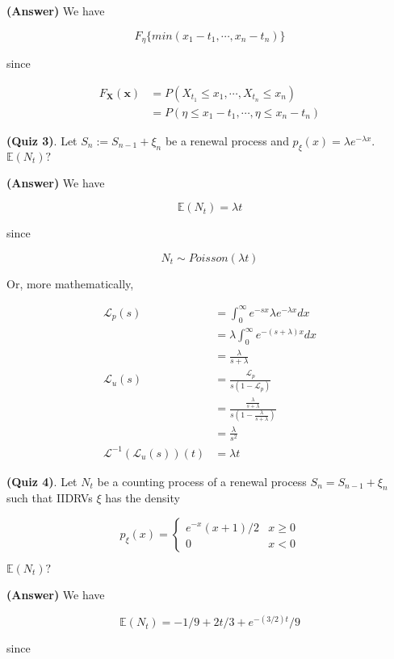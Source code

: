 \documentclass[12pt]{article}
\theoremstyle{nonumberbreak}
\begin{document}
\textbf{(Answer)} We have

$$
F_{\eta} \{ min \left( x_1 - t_1, \cdots, x_n - t_n \right) \}
$$

since

$$
\begin{aligned}
F_\mathbf{X} (\mathbf{x}) &= P(X_{t_1} \le x_1, \cdots, X_{t_n} \le x_n) \\[8pt]
&= P(\eta \le x_1 - t_1, \cdots, \eta \le x_n - t_n)
\end{aligned}
$$


\textbf{(Quiz 3)}. Let $S_n := S_{n-1} + \xi_n$ be a renewal process and $p_\xi (x) = \lambda e^{-\lambda x}$. $\mathbb{E}(N_t)?$

\textbf{(Answer)} We have

$$
\mathbb{E}(N_t) = \lambda t
$$

since

$$
N_t \sim Poisson(\lambda t)
$$

Or, more mathematically, 

$$
\begin{aligned}
\mathcal{L}_p (s) &= \int_0^\infty e^{-sx} \lambda e^{-\lambda x} dx \\[8pt]
&= \lambda \int_0^\infty e^{-(s+\lambda)x} dx \\[8pt]
&= \frac{\lambda}{s + \lambda} \\[10pt]
\mathcal{L}_u (s) &= \frac{\mathcal{L}_p}{s(1-\mathcal{L}_p)} \\[8pt]
&= \frac{\frac{\lambda}{s + \lambda}}{s(1-\frac{\lambda}{s + \lambda})} \\[8pt]
&= \frac{\lambda}{s^2} \\[10pt]
\mathcal{L}^{-1}(\mathcal{L}_u (s))(t) &= \lambda t
\end{aligned}
$$


\textbf{(Quiz 4)}. Let $N_t$ be a counting process of a renewal process $S_n = S_{n-1} + \xi_n$ such that IIDRVs $\xi$ has the density

$$
p_\xi (x) = \begin{cases}
e^{-x} (x+1)/2 & x \ge 0 \\
0 & x <0
\end{cases}
$$

$\mathbb{E}(N_t)?$

\textbf{(Answer)} We have

$$
\mathbb{E}(N_t) = -1/9 + 2t/3 + e^{-(3/2)t}/9
$$

since 
\end{document}
